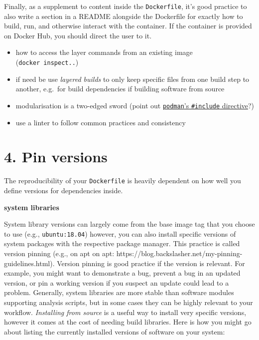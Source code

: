 \documentclass[10pt,letterpaper]{article}
\providecommand{\tightlist}{%
  \setlength{\itemsep}{0pt}\setlength{\parskip}{0pt}}
\begin{document}
Finally, as a supplement to content inside the \texttt{Dockerfile}, it's
good practice to also write a section in a README alongside the
Dockerfile for exactly how to build, run, and otherwise interact with
the container. If the container is provided on Docker Hub, you should
direct the user to it.

\begin{itemize}
\tightlist
\item
  how to access the layer commands from an existing image
  (\texttt{docker\ inspect..}) 
\item
  if need be use \emph{layered builds} to only keep specific files from
  one build step to another, e.g.~for build dependencies if building
  software from source 
\item
  modularisation is a two-edged sword (point out
  \href{https://www.mankier.com/1/podman-build}{\texttt{podman}'s
  \texttt{\#include} directive}?) 
\item
  use a linter to follow common practices and consistency 
\end{itemize}

\hypertarget{pin-versions}{%
\section*{4. Pin versions}\label{pin-versions}}

The reproducibility of your \texttt{Dockerfile} is heavily dependent on
how well you define versions for dependencies inside.

\textbf{system libraries}

System library versions can largely come from the base image tag that
you choose to use (e.g., \texttt{ubuntu:18.04}) however, you can also
install specific versions of system packages with the respective package
manager. This practice is called version pinning (e.g., on apt on apt:
https://blog.backslasher.net/my-pinning-guidelines.html). Version
pinning is good practice if the version is relevant. For example, you
might want to demonstrate a bug, prevent a bug in an updated version, or
pin a working version if you suspect an update could lead to a problem.
Generally, system libraries are more stable than software modules
supporting analysis scripts, but in some cases they can be highly
relevant to your workflow. \emph{Installing from source} is a useful way
to install very specific versions, however it comes at the cost of
needing build libraries. Here is how you might go about listing the
currently installed versions of software on your system:
\end{document}
